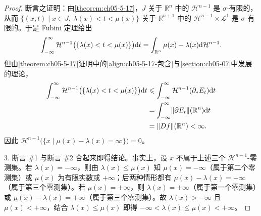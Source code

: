 \documentclass[../../main.tex]{subfiles}%
\begin{document}
\begin{proof}
断言之证明：由\cref{theorem:ch05-5-17}，$J$ 关于 $\mathbb{R}^n$ 中的 $\mathcal{H}^{n-1}$ 是 $\sigma$-有限的，从而 $\{(x,t)\mid x\in J,\ \lambda(x)<t<\mu(x)\}$ 关于 $\mathbb{R}^{n+1}$ 中的 $\mathcal{H}^{n-1}\times\mathcal{L}^1$ 是 $\sigma$-有限的。于是 Fubini 定理给出 %
\begin{align*}
\int_{-\infty}^{\infty}\mathcal{H}^{n-1}\bigl(\{\lambda(x)<t<\mu(x)\}\bigr)\mathrm{d} t=\int_{\mathbb{R}^n}\mu(x)-\lambda(x)\mathrm{d}\mathcal{H}^{n-1} .
\end{align*}
但由\cref{theorem:ch05-5-17}证明中的\eqref{align:ch05-5-17-包含}与\cref{section:ch05-07}中发展的理论， %
\begin{align*}
\int_{-\infty}^{\infty}\mathcal{H}^{n-1}\bigl(\{\lambda(x)<t<\mu(x)\}\bigr)\mathrm{d} t&\leqslant\int_{-\infty}^{\infty}\mathcal{H}^{n-1}(\partial_*E_t)\mathrm{d} t\\
&=\int_{-\infty}^{\infty}\lVert\partial E_t\rVert(\mathbb{R}^n)\mathrm{d} t\\
&=\lVert Df\rVert(\mathbb{R}^n)<\infty .
\end{align*}
因此 $\mathcal{H}^{n-1}\bigl(\{x\mid\mu(x)-\lambda(x)=\infty\}\bigr)=0$。

3. 断言 \#1 与断言 \#2 合起来即得结论。事实上，设 $x$ 不属于上述三个 $\mathcal{H}^{n-1}$-零测集。若 $\lambda(x)=-\infty$，则由 $\lambda(x)\leqslant\mu(x)$ 知 $\mu(x)=-\infty$（属于第二个零测集）或 $\mu(x)$ 为有限实数或 $+\infty$；后两种情形都有 $\mu(x)-\lambda(x)=+\infty$（属于第三个零测集）。若 $\mu(x)=+\infty$，则 $\lambda(x)=+\infty$（属于第一个零测集）或 $\mu(x)-\lambda(x)=+\infty$（属于第三个零测集）。故 $\lambda(x)>-\infty$ 且 $\mu(x)<+\infty$，结合 $\lambda(x)\leqslant\mu(x)$ 即得 $-\infty<\lambda(x)\leqslant\mu(x)<+\infty$。
\end{proof}
\end{document}
